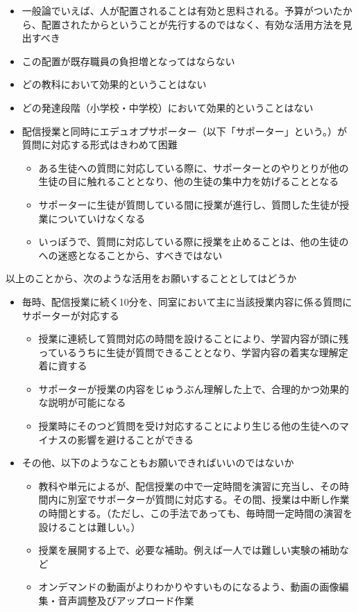 \documentclass[12pt,jafontscale=0.9247]{jlreq}
\begin{document}
\begin{tcolorbox}[title=「エデュオプサポーター」の配置についての意見]
\begin{itemize}
 \item 一般論でいえば、人が配置されることは有効と思料される。予算がついたから、配置されたからということが先行するのではなく、有効な活用方法を見出すべき
 \item この配置が既存職員の負担増となってはならない
 \item どの教科において効果的ということはない
 \item どの発達段階（小学校・中学校）において効果的ということはない
 \item 配信授業と同時にエデュオプサポーター（以下「サポーター」という。）が質問に対応する形式はきわめて困難
        \begin{itemize}
	 \item ある生徒への質問に対応している際に、サポーターとのやりとりが他の生徒の目に触れることとなり、他の生徒の集中力を妨げることとなる
	 \item サポーターに生徒が質問している間に授業が進行し、質問した生徒が授業についていけなくなる
	 \item いっぽうで、質問に対応している際に授業を止めることは、他の生徒のへの迷惑となることから、すべきではない
        \end{itemize}

\end{itemize}


以上のことから、次のような活用をお願いすることとしてはどうか

\begin{itemize}
 \item 毎時、配信授業に続く10分を、同室において主に当該授業内容に係る質問にサポーターが対応する
         \begin{itemize}
	  \item 授業に連続して質問対応の時間を設けることにより、学習内容が頭に残っているうちに生徒が質問できることとなり、学習内容の着実な理解定着に資する
	  \item サポーターが授業の内容をじゅうぶん理解した上で、合理的かつ効果的な説明が可能になる
	  \item 授業時にそのつど質問を受け対応することにより生じる他の生徒へのマイナスの影響を避けることができる
	 \end{itemize}
 \item その他、以下のようなこともお願いできればいいのではないか
          \begin{itemize}
         \item 教科や単元によるが、配信授業の中で一定時間を演習に充当し、その時間内に別室でサポーターが質問に対応する。その間、授業は中断し作業の時間とする。（ただし、この手法であっても、毎時間一定時間の演習を設けることは難しい。）
	   \item 授業を展開する上で、必要な補助。例えば一人では難しい実験の補助など
	   \item オンデマンドの動画がよりわかりやすいものになるよう、動画の画像編集・音声調整及びアップロード作業
	  \end{itemize}
\end{itemize}
\end{tcolorbox}
\end{document}
